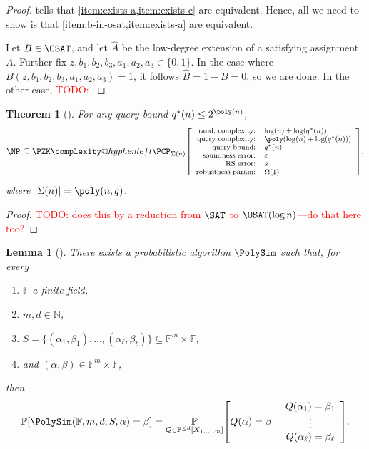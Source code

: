 \documentclass[english,12pt]{reedthesis}
\makeatletter
\theoremstyle{plain}
\newtheorem{thm}{Theorem}[section]
\newtheorem{lemma}[lemma]{Lemma}
\theoremstyle{definition}
\theoremstyle{remark}
\DeclarePairedDelimiter{\abs}{\lvert}{\rvert}
\newcommand{\middlemid}{%
  \ensuremath{\;\middle\vert\;}
}
\newcommand{\pzkpcpr}[6]{%
  \ensuremath%
  \mleft[{\footnotesize\begin{array}{r l}
    \text{rand.\ complexity:} & #1 \\
    \text{query complexity:} & #2 \\
    \text{query bound:} & #3 \\
    \text{soundness error:} & #4 \\
    \text{RS error:} & #5 \\
    \text{robustness param:} & #6
  \end{array}}\mright]%
}
\newcommand{\PZKPCP}{%
  \PZK\complexity@hyphenleft\PCP
}
\newcommand{\TODO}[1]{\textcolor{red}{TODO: #1}}
\makeatother
\begin{document}
\begin{proof}
   tells that \cref{item:exists-a,item:exists-c}
  are equivalent. Hence, all we need to show is that
  \cref{item:b-in-osat,item:exists-a} are equivalent.

  Let $B \in \OSAT$, and let $\hat{A}$ be the low-degree extension of a satisfying
  assignment $A$. Further fix
  $z, b_{1}, b_{2}, b_{3}, a_{1}, a_{2}, a_{3} \in \{0, 1\}$. In the case where
  $B(z, b_{1}, b_{2}, b_{3}, a_{1}, a_{2}, a_{3}) = 1$, it follows
  $\hat{B} = 1 - B = 0$, so we are done. In the other case,
  \TODO{}
\end{proof}

\begin{thm}[{\cite[Theorem 6.3]{GOS25}}]\label{thm:np-zk-pcp}
  For any query bound $q^{*}(n) \le 2^{\poly(n)}$,
  \[
    \NP \subseteq
    \PZKPCP_{\Sigma(n)}\pzkpcpr{\log(n)+\log(q^{*}(n))}{\poly(\log(n) + \log(q^{*}(n)))}{q^{*}(n)}{\varepsilon}{s}{\Omega(1)}.
  \]
  where $\abs{\Sigma(n)} = \poly(n, q)$.
\end{thm}

\begin{proof}
  \TODO{\cite{GOS25} does this by a reduction from $\SAT$ to $\OSAT(\log n)$---do
    that here too?}
\end{proof}

\begin{lemma}[{\cite[Corollary 4.10]{BCFGRS17}}]\label{lem:polysim}
  There exists a probabilistic algorithm $\PolySim$ such that, for every
  \begin{enumerate}
    \item $\mathbb{F}$ a finite field,
    \item $m, d \in \mathbb{N}$,
    \item $S = \{(\alpha_{1}, \beta_{1}), \ldots, (\alpha_{\ell}, \beta_{\ell})\} \subseteq \mathbb{F}^{m} \times \mathbb{F}$,
    \item and $(\alpha, \beta) \in \mathbb{F}^{m} \times \mathbb{F}$,
  \end{enumerate}
  then
  \begin{equation}
    \mathbb{P}\mleft[\PolySim(\mathbb{F}, m, d, S, \alpha) = \beta\mright]
    = \underset{Q \in \mathbb{F}^{\le d}[X_{1, \ldots, m}]}{\mathbb{P}}\mleft[
      Q(\alpha) = \beta \middlemid
      \begin{array}{c}
        Q(\alpha_{1}) = \beta_{1} \\
        \vdots \\
        Q(\alpha_{\ell}) = \beta_{\ell}
      \end{array}
    \mright].
  \end{equation}
\end{lemma}
\end{document}
